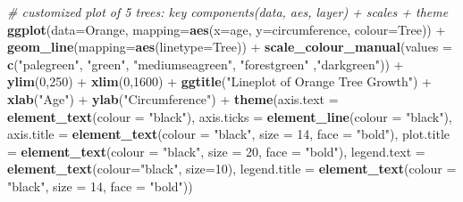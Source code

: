 \documentclass[]{book}
\newenvironment{Shaded}{\begin{snugshade}}{\end{snugshade}}
\newcommand{\KeywordTok}[1]{\textcolor[rgb]{0.13,0.29,0.53}{\textbf{{#1}}}}
\newcommand{\DataTypeTok}[1]{\textcolor[rgb]{0.13,0.29,0.53}{{#1}}}
\newcommand{\DecValTok}[1]{\textcolor[rgb]{0.00,0.00,0.81}{{#1}}}
\newcommand{\StringTok}[1]{\textcolor[rgb]{0.31,0.60,0.02}{{#1}}}
\newcommand{\CommentTok}[1]{\textcolor[rgb]{0.56,0.35,0.01}{\textit{{#1}}}}
\newcommand{\NormalTok}[1]{{#1}}
\begin{document}
\begin{Shaded}
\begin{Highlighting}[]
\CommentTok{# customized plot of 5 trees: key components(data, aes, layer) + scales + theme}
\KeywordTok{ggplot}\NormalTok{(}\DataTypeTok{data=}\NormalTok{Orange, }\DataTypeTok{mapping=}\KeywordTok{aes}\NormalTok{(}\DataTypeTok{x=}\NormalTok{age, }\DataTypeTok{y=}\NormalTok{circumference, }\DataTypeTok{colour=}\NormalTok{Tree)) +}\StringTok{ }
\StringTok{  }\KeywordTok{geom_line}\NormalTok{(}\DataTypeTok{mapping=}\KeywordTok{aes}\NormalTok{(}\DataTypeTok{linetype=}\NormalTok{Tree)) +}\StringTok{ }
\StringTok{  }\KeywordTok{scale_colour_manual}\NormalTok{(}\DataTypeTok{values =} \KeywordTok{c}\NormalTok{(}\StringTok{"palegreen"}\NormalTok{, }\StringTok{"green"}\NormalTok{, }\StringTok{"mediumseagreen"}\NormalTok{, }\StringTok{"forestgreen"} \NormalTok{,}\StringTok{"darkgreen"}\NormalTok{)) +}\StringTok{ }
\StringTok{  }\KeywordTok{ylim}\NormalTok{(}\DecValTok{0}\NormalTok{,}\DecValTok{250}\NormalTok{) +}\StringTok{ }\KeywordTok{xlim}\NormalTok{(}\DecValTok{0}\NormalTok{,}\DecValTok{1600}\NormalTok{) +}\StringTok{ }
\StringTok{  }\KeywordTok{ggtitle}\NormalTok{(}\StringTok{"Lineplot of Orange Tree Growth"}\NormalTok{) +}\StringTok{ }
\StringTok{  }\KeywordTok{xlab}\NormalTok{(}\StringTok{"Age"}\NormalTok{) +}\StringTok{ }\KeywordTok{ylab}\NormalTok{(}\StringTok{"Circumference"}\NormalTok{) +}\StringTok{ }
\StringTok{  }\KeywordTok{theme}\NormalTok{(}\DataTypeTok{axis.text =} \KeywordTok{element_text}\NormalTok{(}\DataTypeTok{colour =} \StringTok{"black"}\NormalTok{), }
  \DataTypeTok{axis.ticks =} \KeywordTok{element_line}\NormalTok{(}\DataTypeTok{colour =} \StringTok{"black"}\NormalTok{), }
  \DataTypeTok{axis.title =} \KeywordTok{element_text}\NormalTok{(}\DataTypeTok{colour =} \StringTok{"black"}\NormalTok{, }\DataTypeTok{size =} \DecValTok{14}\NormalTok{, }\DataTypeTok{face =} \StringTok{"bold"}\NormalTok{),}
  \DataTypeTok{plot.title =} \KeywordTok{element_text}\NormalTok{(}\DataTypeTok{colour =} \StringTok{"black"}\NormalTok{, }\DataTypeTok{size =} \DecValTok{20}\NormalTok{, }\DataTypeTok{face =} \StringTok{"bold"}\NormalTok{), }
  \DataTypeTok{legend.text =} \KeywordTok{element_text}\NormalTok{(}\DataTypeTok{colour=}\StringTok{"black"}\NormalTok{, }\DataTypeTok{size=}\DecValTok{10}\NormalTok{), }
  \DataTypeTok{legend.title =} \KeywordTok{element_text}\NormalTok{(}\DataTypeTok{colour =} \StringTok{"black"}\NormalTok{, }\DataTypeTok{size =} \DecValTok{14}\NormalTok{, }\DataTypeTok{face =} \StringTok{"bold"}\NormalTok{)) }
\end{Highlighting}
\end{Shaded}
\end{document}
